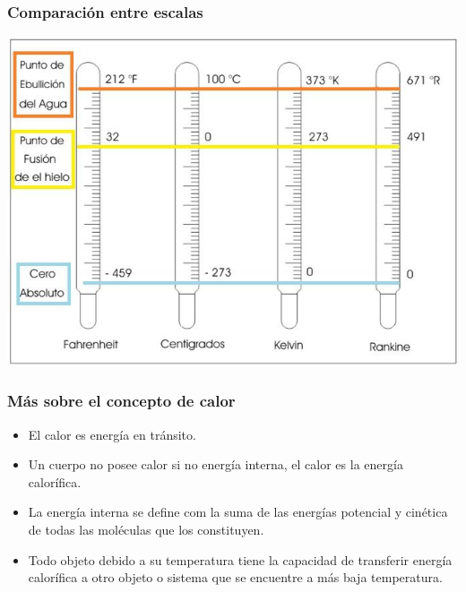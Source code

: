 \documentclass[handout]{beamer}
\begin{document}
\begin{frame}
  \frametitle{Comparación entre escalas}
  \begin{center}
    \includegraphics[scale=0.45]{comparacion}
  \end{center}
\end{frame}

\begin{frame}
  \frametitle{Más sobre el concepto de calor}
  \begin{itemize}
  \item El calor es energía en tránsito.
  \item Un cuerpo no posee calor si no energía interna, el calor es la energía calorífica.
  \item La energía interna se define com la suma de las energías potencial y cinética de todas
    las moléculas que los constituyen.
  \item Todo objeto debido a su temperatura tiene la capacidad de transferir energía
    calorífica a otro objeto o sistema que se encuentre a más baja temperatura.
  \end{itemize}
\end{frame}
\end{document}
